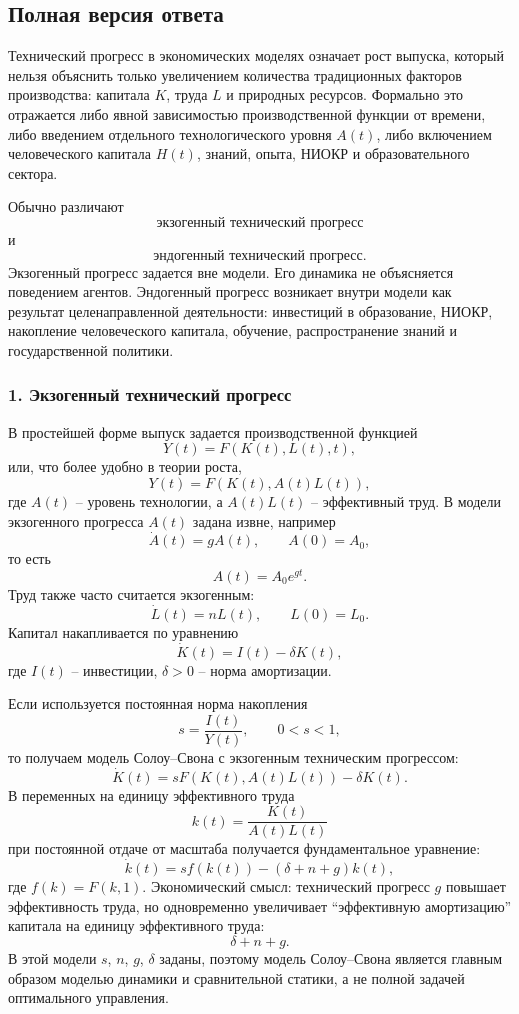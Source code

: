 \documentclass[12pt,a4paper]{article}
\begin{document}
\subsection{Полная версия ответа}
Технический прогресс в экономических моделях означает рост выпуска, который нельзя объяснить только увеличением количества традиционных факторов производства: капитала $K$, труда $L$ и природных ресурсов. Формально это отражается либо явной зависимостью производственной функции от времени, либо введением отдельного технологического уровня $A(t)$, либо включением человеческого капитала $H(t)$, знаний, опыта, НИОКР и образовательного сектора.

Обычно различают
\[
\text{экзогенный технический прогресс}
\]
и
\[
\text{эндогенный технический прогресс}.
\]
Экзогенный прогресс задается вне модели. Его динамика не объясняется поведением агентов. Эндогенный прогресс возникает внутри модели как результат целенаправленной деятельности: инвестиций в образование, НИОКР, накопление человеческого капитала, обучение, распространение знаний и государственной политики.

\subsubsection*{1. Экзогенный технический прогресс}
В простейшей форме выпуск задается производственной функцией
\[
Y(t)=F(K(t),L(t),t),
\]
или, что более удобно в теории роста,
\[
Y(t)=F(K(t),A(t)L(t)),
\]
где $A(t)$ -- уровень технологии, а $A(t)L(t)$ -- эффективный труд. В модели экзогенного прогресса $A(t)$ задана извне, например
\[
\dot A(t)=gA(t), \qquad A(0)=A_0,
\]
то есть
\[
A(t)=A_0e^{gt}.
\]
Труд также часто считается экзогенным:
\[
\dot L(t)=nL(t), \qquad L(0)=L_0.
\]
Капитал накапливается по уравнению
\[
\dot K(t)=I(t)-\delta K(t),
\]
где $I(t)$ -- инвестиции, $\delta>0$ -- норма амортизации.

Если используется постоянная норма накопления
\[
s=\frac{I(t)}{Y(t)}, \qquad 0<s<1,
\]
то получаем модель Солоу--Свона с экзогенным техническим прогрессом:
\[
\dot K(t)=sF(K(t),A(t)L(t))-\delta K(t).
\]
В переменных на единицу эффективного труда
\[
k(t)=\frac{K(t)}{A(t)L(t)}
\]
при постоянной отдаче от масштаба получается фундаментальное уравнение:
\[
\dot k(t)=sf(k(t))-(\delta+n+g)k(t),
\]
где $f(k)=F(k,1)$. Экономический смысл: технический прогресс $g$ повышает эффективность труда, но одновременно увеличивает ``эффективную амортизацию'' капитала на единицу эффективного труда:
\[
\delta+n+g.
\]
В этой модели $s$, $n$, $g$, $\delta$ заданы, поэтому модель Солоу--Свона является главным образом моделью динамики и сравнительной статики, а не полной задачей оптимального управления.
\end{document}
